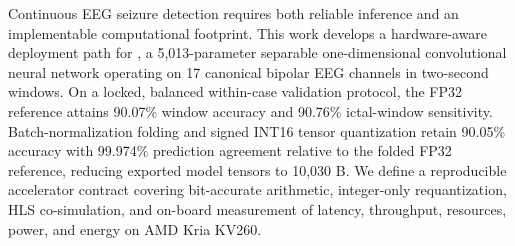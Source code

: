 Continuous EEG seizure detection requires both reliable inference and an
implementable computational footprint. This work develops a hardware-aware
deployment path for \episepset{}, a 5,013-parameter separable one-dimensional
convolutional neural network operating on 17 canonical bipolar EEG channels in
two-second windows. On a locked, balanced within-case validation protocol, the
FP32 reference attains 90.07\% window accuracy and 90.76\% ictal-window
sensitivity. Batch-normalization folding and signed INT16 tensor quantization
retain 90.05\% accuracy with 99.974\% prediction agreement relative to the
folded FP32 reference, reducing exported model tensors to 10,030 B. We define
a reproducible accelerator contract covering bit-accurate arithmetic,
integer-only requantization, HLS co-simulation, and on-board measurement of
latency, throughput, resources, power, and energy on AMD Kria KV260.
